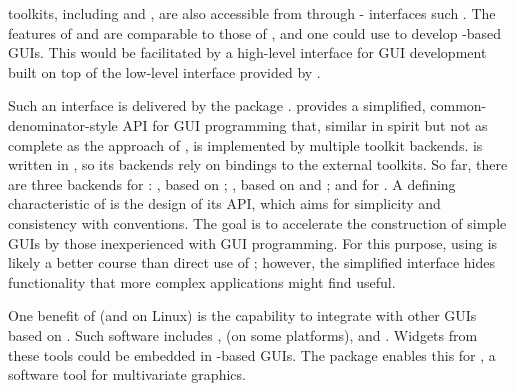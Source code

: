 \documentclass[article]{jss}
\begin{document}
 toolkits, including  and , are
also accessible
from  through - interfaces such
\citep{rJava}. The features
of  and  are comparable to those of , and one could use  to develop -based GUIs. This would be facilitated by a high-level interface for GUI development built on top of the low-level interface provided by . 

Such an interface is delivered by the  package
\citep{gWidgets}.  provides a simplified,
common-denominator-style API for GUI programming that, similar in
spirit but not as complete as the approach of , is
implemented by multiple toolkit backends.  is written in
, so its backends rely on bindings to the external
toolkits. So far, there are three backends for :
, based on ; , based
on  and ; and  for
.  A defining characteristic of  is the
design of its API, which aims for simplicity and consistency with
 conventions.  The goal is to accelerate the construction
of simple GUIs by those inexperienced with GUI programming. For this
purpose, using  is likely a better course than direct
use of ; however, the simplified interface hides
functionality that more complex applications might find useful.

One benefit of  (and  on Linux) is the capability to integrate with other GUIs based on .
Such software includes ,  (on some
platforms), and . Widgets from these tools could be embedded in -based GUIs. The  package enables this for , a software tool for multivariate graphics. 
\end{document}
